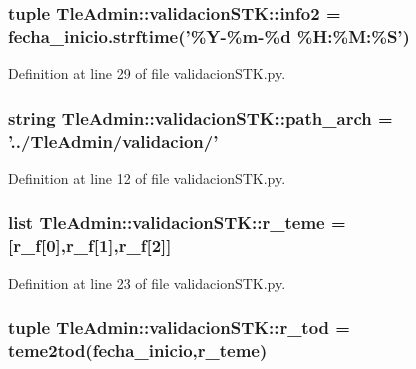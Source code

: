 \subsubsection[{info2}]{\setlength{\rightskip}{0pt plus 5cm}tuple {\bf \-Tle\-Admin\-::validacion\-S\-T\-K\-::info2} = fecha\-\_\-inicio.\-strftime('\%\-Y-\/\%m-\/\%d \%\-H\-:\%\-M\-:\%\-S')}\label{namespace_tle_admin_1_1validacion_s_t_k_aede181d2bff23480a4a255af2cb84d2b}


\-Definition at line 29 of file validacion\-S\-T\-K.\-py.

\subsubsection[{path\-\_\-arch}]{\setlength{\rightskip}{0pt plus 5cm}string {\bf \-Tle\-Admin\-::validacion\-S\-T\-K\-::path\-\_\-arch} = '../\-Tle\-Admin/validacion/'}\label{namespace_tle_admin_1_1validacion_s_t_k_adee99245407e6962bc693a4dfca64d82}


\-Definition at line 12 of file validacion\-S\-T\-K.\-py.

\subsubsection[{r\-\_\-teme}]{\setlength{\rightskip}{0pt plus 5cm}list {\bf \-Tle\-Admin\-::validacion\-S\-T\-K\-::r\-\_\-teme} = [r\-\_\-f[0],r\-\_\-f[1],r\-\_\-f[2]]}\label{namespace_tle_admin_1_1validacion_s_t_k_ab0369222f77fa5c6c6428d58abaf4f8b}


\-Definition at line 23 of file validacion\-S\-T\-K.\-py.

\subsubsection[{r\-\_\-tod}]{\setlength{\rightskip}{0pt plus 5cm}tuple {\bf \-Tle\-Admin\-::validacion\-S\-T\-K\-::r\-\_\-tod} = teme2tod({\bf fecha\-\_\-inicio},{\bf r\-\_\-teme})}\label{namespace_tle_admin_1_1validacion_s_t_k_a9735750a3f7bb688f5031e9c5d83992d}


